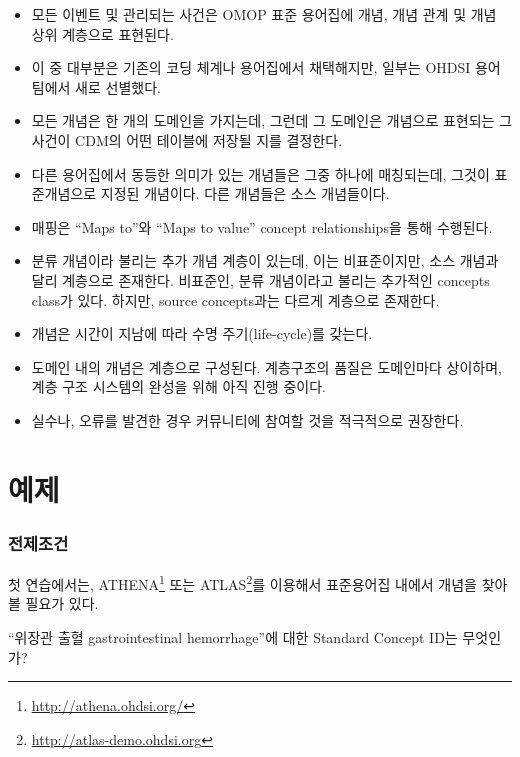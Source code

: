 \documentclass[11pt]{book}
\providecommand{\tightlist}{%
  \setlength{\itemsep}{0pt}\setlength{\parskip}{0pt}}
\let\rmarkdownfootnote\footnote%
\def\footnote{\protect\rmarkdownfootnote}
\theoremstyle{definition}
\theoremstyle{definition}
\theoremstyle{definition}
\theoremstyle{remark}
\let\BeginKnitrBlock\begin \let\EndKnitrBlock\end
\begin{document}
\BeginKnitrBlock{rmdsummary}
\begin{itemize}
\tightlist
\item
  모든 이벤트 및 관리되는 사건은 OMOP 표준 용어집에 개념, 개념 관계 및
  개념 상위 계층으로 표현된다.
\item
  이 중 대부분은 기존의 코딩 체계나 용어집에서 채택해지만, 일부는 OHDSI
  용어팀에서 새로 선별했다.
\item
  모든 개념은 한 개의 도메인을 가지는데, 그런데 그 도메인은 개념으로
  표현되는 그 사건이 CDM의 어떤 테이블에 저장될 지를 결정한다.
\item
  다른 용어집에서 동등한 의미가 있는 개념들은 그중 하나에 매칭되는데,
  그것이 표준개념으로 지정된 개념이다. 다른 개념들은 소스 개념들이다.
\item
  매핑은 ``Maps to''와 ``Maps to value'' concept relationships을 통해
  수행된다.
\item
  분류 개념이라 불리는 추가 개념 계층이 있는데, 이는 비표준이지만, 소스
  개념과 달리 계층으로 존재한다. 비표준인, 분류 개념이라고 불리는
  추가적인 concepts class가 있다. 하지만, source concepts과는 다르게
  계층으로 존재한다.
\item
  개념은 시간이 지남에 따라 수명 주기(life-cycle)를 갖는다.
\item
  도메인 내의 개념은 계층으로 구성된다. 계층구조의 품질은 도메인마다
  상이하며, 계층 구조 시스템의 완성을 위해 아직 진행 중이다.
\item
  실수나, 오류를 발견한 경우 커뮤니티에 참여할 것을 적극적으로 권장한다.
\end{itemize}
\EndKnitrBlock{rmdsummary}

\section{예제}\label{-1}

\subsubsection*{전제조건}

첫 연습에서는, ATHENA\footnote{\url{http://athena.ohdsi.org/}} 또는
ATLAS\footnote{\url{http://atlas-demo.ohdsi.org}}를 이용해서 표준용어집
내에서 개념을 찾아 볼 필요가 있다.

\BeginKnitrBlock{exercise}
\protect\hypertarget{exr:exerciseVocab1}{}{\label{exr:exerciseVocab1}
}``위장관 출혈 gastrointestinal hemorrhage''에 대한 Standard Concept
ID는 무엇인가?
\EndKnitrBlock{exercise}
\end{document}
